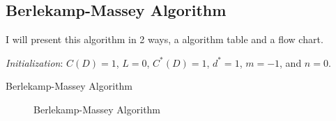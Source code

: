 \subsection{Berlekamp-Massey Algorithm}\label{subsec:Berlekamp_Massey_Algorithm}
I will present this algorithm in 2 ways, a algorithm table and a flow chart.

\begin{algorithm}[H]
  \DontPrintSemicolon{}
  
  \BlankLine{}
  \textit{Initialization}: $C(D) = 1$, $L=0$, $C^{*}(D) = 1$, $d^{*} = 1$, $m = -1$, and $n=0$. \;
  \caption{Berlekamp-Massey Algorithm}
  \label{fig:Berlekamp_Massey_Algorithm}
\end{algorithm}

\begin{figure}[h!]
  \centering
  
  \caption{Berlekamp-Massey Algorithm}
  \label{fig:Berlekamp_Massey_Algorithm}
\end{figure}

